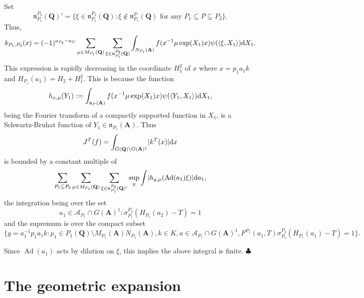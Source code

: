\documentclass[11pt]{amsart}
\renewcommand\qedsymbol{$\clubsuit$}
\def\A{\mathbf A}
\def\Q{\mathbf Q}
\def\AAA{\mathcal A}	%
\def\d{\text d}
\def\Ad{\operatorname{Ad}}
\def\bs{\setminus} 			%
\def\mod#1{\lvert #1 \rvert} %
\def\nnn{\mathfrak n}
\def\se{\subseteq}
\def\sprod#1#2{\left\langle #1 , #2 \right\rangle}  %
\theoremstyle{remark}
\begin{document}
Set 
\[ \nnn_{P_1}^{P_2}(\Q)' = \{ \xi \in \nnn_{P_1}^{P_2}(\Q) : \xi \not\in \nnn_{P_1}^{P}(\Q) 
		\text{ for any } P_1 \se P \subsetneq P_2 \}.\]
Thus,
\[ k_{P_1, P_2}(x) = (-1)^{a_{P_2} - a_G} \sum_{\mu \in M_{P_1}(\Q)} \sum_{\xi \in \nnn_{P_1}^{P_2}(\Q)}
		\int_{N_{P_1}(\A)} f(x^{-1} \mu \exp(X_1) x) \psi(\sprod{\xi}{X_1}) \d X_1. \]
This expression is rapidly decreasing in the coordinate $H_1^2$ of $x$ where $x = p_1 a_1 k$ and $H_{P_1}(a_1) = H_2 + H_1^2$. This is because the function
\[ h_{x, \mu}(Y_1) := \int_{\nnn_P(\A)} f(x^{-1} \mu \exp(X_1) x) \psi(\sprod{Y_1}{X_1}) \d X_1, \]
being the Fourier transform of a compactly supported function in $X_1$, is a Schwartz-Bruhat function of $Y_1 \in \nnn_{P_1}(\A)$. Thus 
\[ J^T(f) = \int_{G(\Q) \bs G(\A)^1} \mod{k^T(x)} \d x \]
is bounded by a constant multiple of 
\[ \sum_{P_1 \se P_2} \sum_{\mu \in M_{P_1}(\Q)} \sum_{\xi \in \nnn_{P_1}^{P_2}(\Q)'} \sup_y \int 
		\mod{h_{y, \mu}(\Ad(a_1) \xi)} \d a_1, \]
the integration being over the set
\[ a_1 \in \AAA_{P_1} \cap G(\A)^1 : \sigma_{P_1}^{P_2}(H_{P_1}(a_2) - T) = 1 \]
and the supremum is over the compact subset 
\[ \{ y = a_1^{-1} p_1 a_1 k : p_1 \in P_1(\Q)\bs M_{P_1}(\A) N_{P_1}(\A), k \in K , a \in \AAA_{P_1} \cap G(\A)^1,
		F^{P_1}(a_1, T) \sigma_{P_1}^{P_2}(H_{P_1}(a_1) - T) = 1 \}. \]
\iffalse 
\begin{itemize}
	\item \[ \d X_1 \d x = \d (a_1^{-1} X_1 a_1) \d p_1 \d a_1 \d k. 
	\item $h_{X, \mu}(Y_1)
\end{itemize}
\fi
Since $\Ad(a_1)$ acts by dilation on $\xi$, this implies the above integral is finite. 
\qedsymbol

\section{The geometric expansion}
\end{document}
